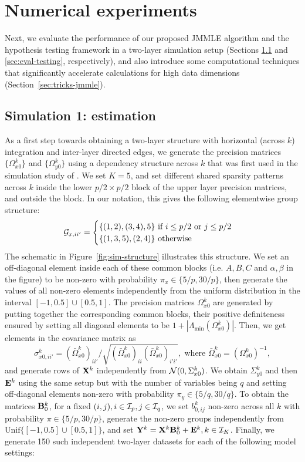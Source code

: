 \section{Numerical experiments}
\label{sec:sec4}
Next, we evaluate the performance of our proposed JMMLE algorithm and the hypothesis testing framework in a two-layer simulation setup (Sections \ref{sec:eval-jmmle} and \ref{sec:eval-testing}, respectively), and also introduce some computational techniques that significantly accelerate calculations for high data dimensions (Section~\ref{sec:tricks-jmmle}).

\subsection{Simulation 1: estimation}
\label{sec:eval-jmmle}
As a first step towards obtaining a two-layer structure with horizontal (across $k$) integration and inter-layer directed edges, we generate the precision matrices $\{ \Omega_{x0}^k \}$ and $\{ \Omega_{y0}^k \}$ using a dependency structure across $k$ that was first used in the simulation study of \citet{MaMichailidis15}. We set $K=5$, and set different shared sparsity patterns across $k$ inside the lower $p/2 \times p/2$ block of the upper layer precision matrices, and outside the block. In our notation, this gives the following elementwise group structure:
%
$$
{\cal{G}}_{x,ii'} = \begin{cases}
\{ (1,2),(3,4), 5 \} \text{ if } i \leq p/2 \text{ or } j \leq p/2\\
\{ (1,3,5),(2,4) \} \text{ otherwise }
\end{cases}
$$
%
The schematic in Figure~\ref{fig:sim-structure} illustrates this structure. We set an off-diagonal element inside each of these common blocks (i.e. $A,B,C$ and $\alpha, \beta$ in the figure) to be non-zero with probability $\pi_x \in \{ 5/p, 30/p \}$, then generate the values of all non-zero elements independently from the uniform distribution in the interval $[-1, 0.5] \cup [0.5, 1]$. The precision matrices $\Omega_{x0}^k$ are generated by putting together the corresponding common blocks, their positive definiteness ensured by setting all diagonal elements to be $1 + |\Lambda_{\min} (\Omega_{x0}^k)|$. Then, we get elements in the covariance matrix as
%
$$
\sigma_{x0,ii'}^k = (\bar \Omega_{x0}^k)_{ii'} / \sqrt{(\bar \Omega_{x0}^k)_{ii} (\bar \Omega_{x0}^k)_{i'i'} },
\text{ where } \bar \Omega_{x0}^k = (\Omega_{x0}^k)^{-1},
$$
and generate rows of ${\mathbf{X}}^k$ independently from ${\cal{N}}(0, \Sigma_{x0}^k)$. We obtain $\Sigma_{y0}^k$ and then ${\mathbf{E}}^k$ using the same setup but with the number of variables being $q$ and setting off-diagonal elements non-zero with probability $\pi_y \in \{ 5/q, 30/q \}$. To obtain the matrices ${\mathbf{B}}_0^k$, for a fixed $(i,j), i \in {\cal{I}}_p, j \in {\cal{I}}_q$, we set $b_{0,ij}^k$ non-zero across all $k$ with probability $\pi \in \{ 5/p, 30/p \}$, generate the non-zero groups independently from $\text{Unif} \{ [-1, 0.5] \cup [0.5, 1] \}$, and set ${\mathbf{Y}}^k = {\mathbf{X}}^k {\mathbf{B}}_0^k + {\mathbf{E}}^k, k \in {\cal{I}}_K$. Finally, we generate 150 such independent two-layer datasets for each of the following model settings:

